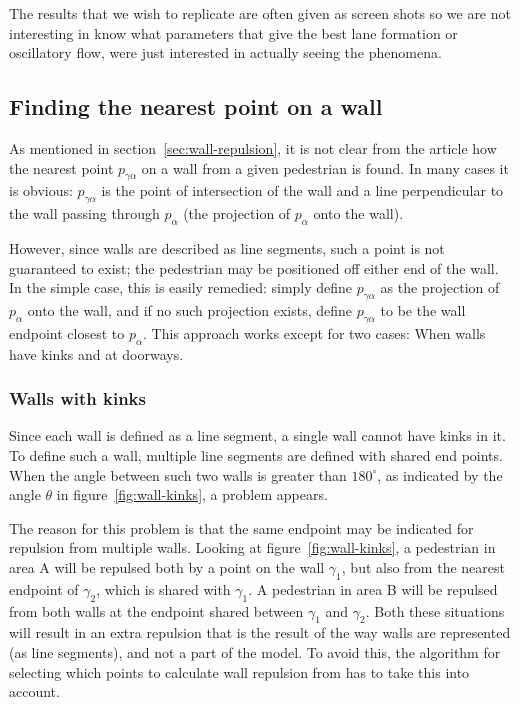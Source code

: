 The results that we wish to replicate are often given as screen shots so we 
are not interesting in know what parameters that give the best lane formation 
or oscillatory flow, were just interested in actually seeing the phenomena.

\subsection{Finding the nearest point on a wall}
\label{sec:repulsion-points}
As mentioned in section~\ref{sec:wall-repulsion}, it is not clear from the 
article how the nearest point $p_{\gamma \alpha}$ on a wall from a given 
pedestrian is found. In many cases it is obvious: $p_{\gamma \alpha}$ is the 
point of intersection of the wall and a line perpendicular to the wall passing 
through $p_\alpha$ (the projection of $p_\alpha$ onto the wall).

However, since walls are described as line segments, such a point is not 
guaranteed to exist; the pedestrian may be positioned off either end of the 
wall. In the simple case, this is easily remedied: simply define $p_{\gamma 
\alpha}$ as the projection of $p_\alpha$ onto the wall, and if no such 
projection exists, define $p_{\gamma \alpha}$ to be the wall endpoint closest 
to $p_\alpha$. This approach works except for two cases: When walls have kinks 
and at doorways.

\subsubsection{Walls with kinks}
Since each wall is defined as a line segment, a single wall cannot have kinks 
in it. To define such a wall, multiple line segments are defined with shared 
end points. When the angle between such two walls is greater than $180^\circ$, 
as indicated by the angle $\theta$ in figure~\ref{fig:wall-kinks}, a 
problem appears.

The reason for this problem is that the same endpoint may be indicated for 
repulsion from multiple walls. Looking at figure~\ref{fig:wall-kinks}, a 
pedestrian in area A will be repulsed both by a point on the wall $\gamma_1$, 
but also from the nearest endpoint of $\gamma_2$, which is shared with 
$\gamma_1$. A pedestrian in area B will be repulsed from both walls at the 
endpoint shared between $\gamma_1$ and $\gamma_2$. Both these situations will 
result in an extra repulsion that is the result of the way walls are 
represented (as line segments), and not a part of the model. To avoid this, 
the algorithm for selecting which points to calculate wall repulsion from has 
to take this into account.

